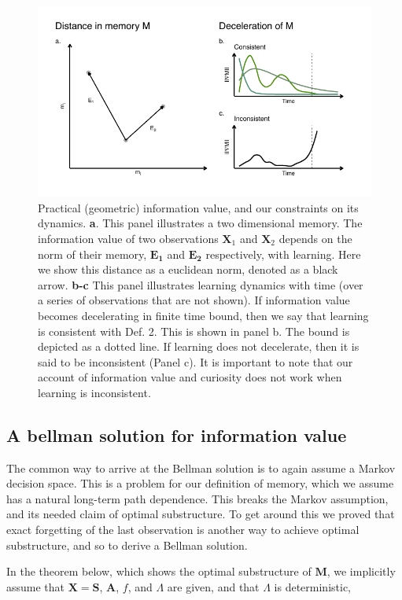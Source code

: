 \begin{figure}
	\includegraphics[width=1\linewidth]{img/cartoon.pdf} 
	\caption{Practical (geometric) information value, and our constraints on its dynamics. 
	\textbf{a}. This panel illustrates a two dimensional memory. The information value of two observations $\mathbf{X}_1$ and $\mathbf{X}_2$ depends on the norm of their memory, $\mathbf{E_1}$ and $\mathbf{E_2}$ respectively, with learning. Here we show this distance as a euclidean norm, denoted as a black arrow.
	\textbf{b-c} This panel illustrates learning dynamics with time (over a series of observations that are not shown). If information value becomes decelerating in finite time bound, then we say that learning is consistent with Def. 2. This is shown in panel b. The bound is depicted as a dotted line. If learning does not decelerate, then it is said to be inconsistent (Panel c). It is important to note that our account of information value and curiosity does not work when learning is inconsistent.
  	}
	\label{fig:cartoon} 
\end{figure}

\subsection*{A bellman solution for information value}
The common way to arrive at the Bellman solution is to again assume a Markov decision space. This is a problem for our definition of memory, which we assume has a natural long-term path dependence. This breaks the Markov assumption, and its needed claim of optimal substructure. To get around this we proved that exact forgetting of the last observation is another way to achieve optimal substructure, and so to derive a Bellman solution.

In the theorem below, which shows the optimal substructure of $\mathbf{M}$, we implicitly assume that $\mathbf{X} = \mathbf{S}$, $\mathbf{A}$, $f$, and $\Lambda$ are given, and that $\Lambda$ is deterministic, 

